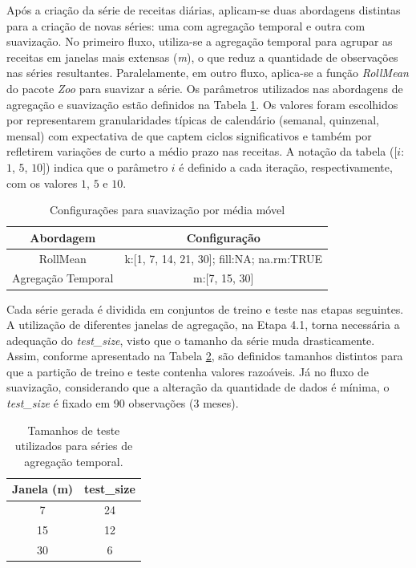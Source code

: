 \documentclass[12pt]{tcc}
\begin{document}
Após a criação da série de receitas diárias, aplicam-se duas abordagens distintas para a criação de novas séries: uma com agregação temporal e outra com suavização. No primeiro fluxo, utiliza-se a agregação temporal para agrupar as receitas em janelas mais extensas (\emph{m}), o que reduz a quantidade de observações nas séries resultantes. Paralelamente, em outro fluxo, aplica-se a função \textit{RollMean} do pacote \textit{Zoo} \citep{zeileis_zoo_2005} para suavizar a série. Os parâmetros utilizados nas abordagens de agregação e suavização estão definidos na Tabela \ref{tab:tabela_configuracao_abordagens}. Os valores foram escolhidos por representarem granularidades típicas de calendário (semanal, quinzenal, mensal) com expectativa de que captem ciclos significativos  e também por refletirem variações de curto a médio prazo nas receitas. A notação da tabela ([$i$: $1$, $5$, $10$]) indica que o parâmetro $i$ é definido a cada iteração, respectivamente, com os valores $1$, $5$ e $10$.

\begin{table}[!ht]
    \centering
    \caption{Configurações para suavização por média móvel}
    \begin{tabular}{c c}
        \hline
        \textbf{Abordagem} & \textbf{Configuração} \\
        \hline
            RollMean & k:[1, 7, 14, 21, 30]; fill:NA; na.rm:TRUE \\
            Agregação Temporal & m:[7, 15, 30] \\
        \hline
    \end{tabular}
    \label{tab:tabela_configuracao_abordagens}
\end{table}

Cada série gerada é dividida em conjuntos de treino e teste nas etapas seguintes. A utilização de diferentes janelas de agregação, na Etapa 4.1, torna necessária a adequação do \textit{test\_size}, visto que o tamanho da série muda drasticamente. Assim, conforme apresentado na Tabela \ref{tab:parametros_agregacao}, são definidos tamanhos distintos para que a partição de treino e teste contenha valores razoáveis. Já no fluxo de suavização, considerando que a alteração da quantidade de dados é mínima, o \textit{test\_size} é fixado em 90 observações (3 meses). 

\begin{table}[!ht]
    \centering
    \begin{tabular}{c c}
        \hline
        \textbf{Janela (m)} & \textbf{test\_size} \\
        \hline
        7 & 24 \\
        15 & 12 \\
        30 & 6 \\
        \hline
    \end{tabular}
    \caption{Tamanhos de teste utilizados para séries de agregação temporal.}
    \label{tab:parametros_agregacao}
\end{table}
\end{document}
